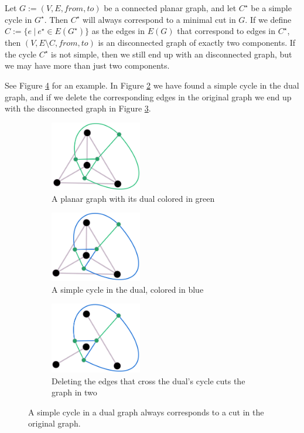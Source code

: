 \begin{fact}
\label{fact:dual-cycle-is-real-cut}
    Let $G := (V, E, from, to)$ be a connected planar graph, and let $C^\star$ be a simple cycle in $G^\star$. Then $C^\star$ will always correspond to a minimal cut in $G$. If we define $C := \{e ~ | ~ e^\star \in E(G^\star)\}$ as the edges in $E(G)$ that correspond to edges in $C^\star$, then $(V,E \setminus C, from, to)$ is an disconnected graph of exactly two components. If the cycle $C^\star$ is not simple, then we still end up with an disconnected graph, but we may have more than just two components.

    See Figure \ref{figure:cycle-cut} for an example. In Figure \ref{figure:dual-with-cycle} we have found a simple cycle in the dual graph, and if we delete the corresponding edges in the original graph we end up with the disconnected graph in Figure \ref{subfigure:k4-cut}.
\end{fact}

\begin{figure}[h]
    \centering
    \begin{subfigure}{.3\textwidth}
        \centering
        \includegraphics[width=4cm]{figures/duality/k4 with dual.png}
        \caption{A planar graph with its dual colored in green}
        \label{subfigure:k4-with-dual}
    \end{subfigure}\hfill%
    \begin{subfigure}{.3\textwidth}
        \centering
        \includegraphics[width=4cm]{figures/duality/dual with cycle.png}
        \caption{A simple cycle in the dual, colored in blue}
        \label{figure:dual-with-cycle}
    \end{subfigure}\hfill%
    \begin{subfigure}{.3\textwidth}
        \centering
        \includegraphics[width=4cm]{figures/duality/k4 cut in pieces.png}
        \caption{Deleting the edges that cross the dual's cycle cuts the graph in two}
        \label{subfigure:k4-cut}
    \end{subfigure}
    \caption{A simple cycle in a dual graph always corresponds to a cut in the original graph.}
    \label{figure:cycle-cut}
\end{figure}

